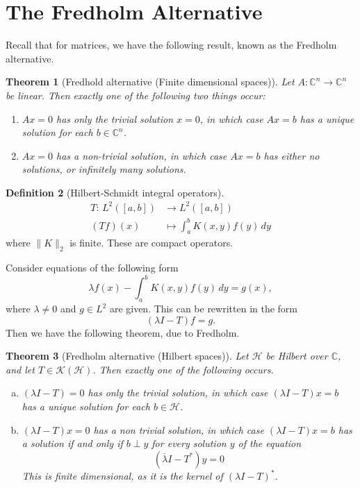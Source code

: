 \documentclass[10pt, oneside, reqno]{amsbook}
\theoremstyle{plain}%
\newtheorem{thm}{Theorem}[section]
\theoremstyle{definition}
\newtheorem{defn}[thm]{Definition}
\theoremstyle{remark}
\newcommand{\Com}{\mathbb{C}}
\newcommand{\mapping}[5]{\begin{align*}
    #1 : \,     #2 &\rightarrow #3 \\
            #4  &\mapsto #5
\end{align*}    
}
\begin{document}
\section{The Fredholm Alternative}

Recall that for matrices, we have the following result, known as the Fredholm alternative.    

\begin{thm}[Fredhold alternative (Finite dimensional spaces)]
    Let $A: \Com^n \rightarrow \Com^n$ be linear.  Then exactly one of the following two things occur:
    \begin{enumerate}[(1)]
        \item $Ax = 0$ has only the trivial solution $x = 0$, in which case $Ax = b$ has a unique solution for each $b \in \Com^n$.  
        \item $Ax = 0$ has a non-trivial solution, in which case $Ax = b$ has either no solutions, or infinitely many solutions.
    \end{enumerate}
\end{thm}

\begin{defn}[Hilbert-Schmidt integral operators]
    \mapping{T}{L^2([a,b])}{L^2([a,b])}{(Tf)(x)}{\int_a^bK(x, y) f(y) \, dy} where $\| K \|_2$ is finite.  These are compact operators.    
\end{defn}

Consider equations of the following form\[
    \lambda f(x) - \int_a^b K(x, y) f(y) \, dy = g(x),
\] where $\lambda \neq 0$ and $g \in L^2$ are given. This can be rewritten in the form \[
    (\lambda I - T) f = g.
\]  Then we have the following theorem, due to Fredholm. 

\begin{thm}[Fredholm alternative (Hilbert spaces)]
    Let $\mathcal H$ be Hilbert over $\Com$, and let $T \in \mathcal K(\mathcal H)$.  Then exactly one of the following occurs.
    \begin{enumerate}[(a)]
        \item $(\lambda I - T) = 0$ has only the trivial solution, in which case $(\lambda I - T)x = b$ has a unique solution for each $b \in \mathcal H$.  
        \item $(\lambda I - T) x = 0$ has a non trivial solution, in which case $(\lambda I - T) x = b$ has a solution if and only if $b \perp y$ for every solution $y$ of the equation \[
            (\overline \lambda I - T^*) y = 0
        \]  This is finite dimensional, as it is the kernel of $(\lambda I - T)^*$.   
    \end{enumerate}
\end{thm}
    
\end{document}
